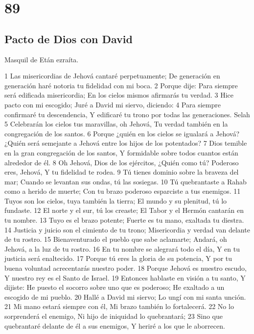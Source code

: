\chapter{89}

\section*{Pacto de Dios con David}

Masquil de Etán ezraíta.

1 Las misericordias de Jehová cantaré perpetuamente;
De generación en generación haré notoria tu fidelidad con mi boca.
2 Porque dije: Para siempre será edificada misericordia;
En los cielos mismos afirmarás tu verdad.
3 Hice pacto con mi escogido;
Juré a David mi siervo, diciendo:
4 Para siempre confirmaré tu descendencia,
Y edificaré tu trono por todas las generaciones.  Selah
5 Celebrarán los cielos tus maravillas, oh Jehová,
Tu verdad también en la congregación de los santos.
6 Porque ¿quién en los cielos se igualará a Jehová?
¿Quién será semejante a Jehová entre los hijos de los potentados?
7 Dios temible en la gran congregación de los santos,
Y formidable sobre todos cuantos están alrededor de él.
8 Oh Jehová, Dios de los ejércitos,
¿Quién como tú? Poderoso eres, Jehová,
Y tu fidelidad te rodea.
9 Tú tienes dominio sobre la braveza del mar;
Cuando se levantan sus ondas, tú las sosiegas.
10 Tú quebrantaste a Rahab como a herido de muerte;
Con tu brazo poderoso esparciste a tus enemigos.
11 Tuyos son los cielos, tuya también la tierra;
El mundo y su plenitud, tú lo fundaste.
12 El norte y el sur, tú los creaste;
El Tabor y el Hermón cantarán en tu nombre.
13 Tuyo es el brazo potente;
Fuerte es tu mano, exaltada tu diestra.
14 Justicia y juicio son el cimiento de tu trono;
Misericordia y verdad van delante de tu rostro.
15 Bienaventurado el pueblo que sabe aclamarte;
Andará, oh Jehová, a la luz de tu rostro.
16 En tu nombre se alegrará todo el día,
Y en tu justicia será enaltecido.
17 Porque tú eres la gloria de su potencia,
Y por tu buena voluntad acrecentarás nuestro poder.
18 Porque Jehová es nuestro escudo,
Y nuestro rey es el Santo de Israel.
19 Entonces hablaste en visión a tu santo,
Y dijiste: He puesto el socorro sobre uno que es poderoso;
He exaltado a un escogido de mi pueblo.
20 Hallé a David mi siervo;
Lo ungí con mi santa unción.
21 Mi mano estará siempre con él,
Mi brazo también lo fortalecerá.
22 No lo sorprenderá el enemigo,
Ni hijo de iniquidad lo quebrantará;
23 Sino que quebrantaré delante de él a sus enemigos,
Y heriré a los que le aborrecen.
